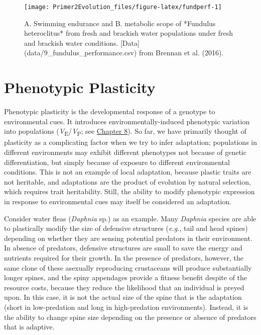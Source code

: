 \documentclass[
]{book}
\begin{document}
\begin{figure}
\texttt{[image: Primer2Evolution\_files/figure-latex/fundperf-1]} \caption{A. Swimming endurance and B. metabolic scope of *Fundulus heteroclitus* from fresh and brackish water populations under fresh and brackish water conditions. [Data](data/9_fundulus_performance.csv) from Brennan et al. (2016).}\label{fig:fundperf}
\end{figure}

\hypertarget{phenotypic-plasticity}{%
\section{Phenotypic Plasticity}\label{phenotypic-plasticity}}

Phenotypic plasticity is the developmental response of a genotype to environmental cues. It introduces environmentally-induced phenotypic variation into populations (\emph{V}\textsubscript{E}/\emph{V}\textsubscript{P}; see \href{https://www.k-state.edu/biology/p2e/the-evolution-of-quantitative-traits.html\#quantitative-traits-a-product-of-genes-and-environment}{Chapter 8}). So far, we have primarily thought of plasticity as a complicating factor when we try to infer adaptation; populations in different environments may exhibit different phenotypes not because of genetic differentiation, but simply because of exposure to different environmental conditions. This is not an example of local adaptation, because plastic traits are not heritable, and adaptations are the product of evolution by natural selection, which requires trait heritability. Still, the ability to modify phenotypic expression in response to environmental cues may itself be considered an adaptation.

Consider water fleas (\emph{Daphnia} sp.) as an example. Many \emph{Daphnia} species are able to plastically modify the size of defensive structures (\emph{e.g.}, tail and head spines) depending on whether they are sensing potential predators in their environment. In absence of predators, defensive structures are small to save the energy and nutrients required for their growth. In the presence of predators, however, the same clone of these asexually reproducing crustaceans will produce substantially longer spines, and the spiny appendages provide a fitness benefit despite of the resource costs, because they reduce the likelihood that an individual is preyed upon. In this case, it is not the actual size of the spine that is the adaptation (short in low-predation and long in high-predation environments). Instead, it is the ability to change spine size depending on the presence or absence of predators that is adaptive.
\end{document}
